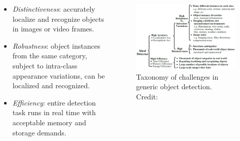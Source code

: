 \documentclass{beamer}
\begin{document}
\begin{frame}
    \begin{columns}
        \begin{column}{0.45\textwidth}
            \begin{itemize}
                \item \emph{Distinctiveness}: accurately localize and recognize objects in images or video frames.
                \item \emph{Robustness}: object instances from the same category, subject to intra-class appearance variations, can be localized and recognized.
                \item \emph{Efficiency}: entire detection task runs in real time with acceptable memory and storage demands.
            \end{itemize}
        \end{column}
        \begin{column}{0.55\textwidth}
            \begin{figure}
                \includegraphics[width=\textwidth]{images/ideal_detector.png}
                \caption{Taxonomy of challenges in generic object detection.
                \hbox{\scriptsize Credit:}
                }
            \end{figure}
        \end{column}
    \end{columns}
\end{frame}
\end{document}
